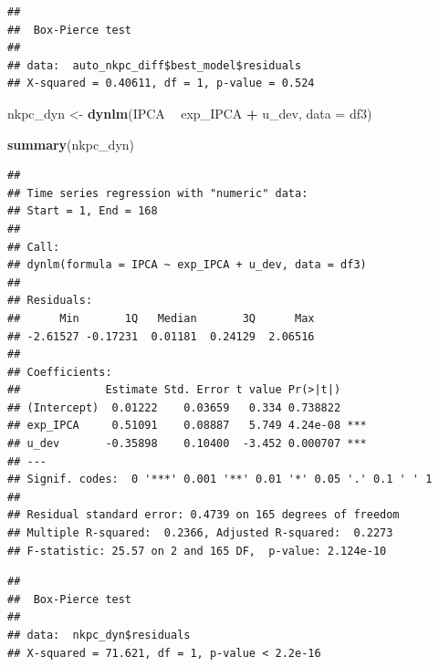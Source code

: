 \documentclass[
]{article}
\newenvironment{Shaded}{\begin{snugshade}}{\end{snugshade}}
\newcommand{\DataTypeTok}[1]{\textcolor[rgb]{0.13,0.29,0.53}{#1}}
\newcommand{\KeywordTok}[1]{\textcolor[rgb]{0.13,0.29,0.53}{\textbf{#1}}}
\newcommand{\NormalTok}[1]{#1}
\newcommand{\OperatorTok}[1]{\textcolor[rgb]{0.81,0.36,0.00}{\textbf{#1}}}
\newcommand{\StringTok}[1]{\textcolor[rgb]{0.31,0.60,0.02}{#1}}
\begin{document}
\begin{Shaded}
\end{Shaded}

\begin{verbatim}
## 
##  Box-Pierce test
## 
## data:  auto_nkpc_diff$best_model$residuals
## X-squared = 0.40611, df = 1, p-value = 0.524
\end{verbatim}

\begin{Shaded}
\begin{Highlighting}[]
\NormalTok{nkpc_dyn <-}\StringTok{ }\KeywordTok{dynlm}\NormalTok{(IPCA }\OperatorTok{~}\StringTok{ }\NormalTok{exp_IPCA }\OperatorTok{+}\StringTok{ }\NormalTok{u_dev, }\DataTypeTok{data =}\NormalTok{ df3)}

\KeywordTok{summary}\NormalTok{(nkpc_dyn)}
\end{Highlighting}
\end{Shaded}

\begin{verbatim}
## 
## Time series regression with "numeric" data:
## Start = 1, End = 168
## 
## Call:
## dynlm(formula = IPCA ~ exp_IPCA + u_dev, data = df3)
## 
## Residuals:
##      Min       1Q   Median       3Q      Max 
## -2.61527 -0.17231  0.01181  0.24129  2.06516 
## 
## Coefficients:
##             Estimate Std. Error t value Pr(>|t|)    
## (Intercept)  0.01222    0.03659   0.334 0.738822    
## exp_IPCA     0.51091    0.08887   5.749 4.24e-08 ***
## u_dev       -0.35898    0.10400  -3.452 0.000707 ***
## ---
## Signif. codes:  0 '***' 0.001 '**' 0.01 '*' 0.05 '.' 0.1 ' ' 1
## 
## Residual standard error: 0.4739 on 165 degrees of freedom
## Multiple R-squared:  0.2366, Adjusted R-squared:  0.2273 
## F-statistic: 25.57 on 2 and 165 DF,  p-value: 2.124e-10
\end{verbatim}

\begin{Shaded}
\end{Shaded}

\begin{verbatim}
## 
##  Box-Pierce test
## 
## data:  nkpc_dyn$residuals
## X-squared = 71.621, df = 1, p-value < 2.2e-16
\end{verbatim}
\end{document}
